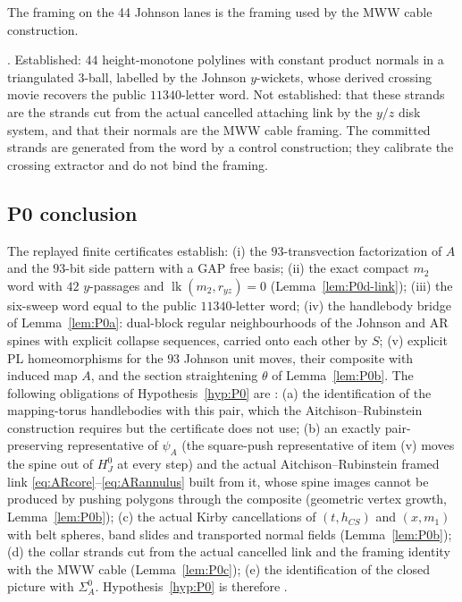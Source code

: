 \begin{lemma}\label{lem:P0c}
The framing on the 44 Johnson lanes is the framing used by the MWW cable
construction.
\end{lemma}

\begin{remark}
\Open.  Established: $44$ height-monotone polylines with constant product
normals in a triangulated $3$-ball, labelled by the Johnson $y$-wickets,
whose derived crossing movie recovers the public $11340$-letter word.  Not
established: that these strands are the strands cut from the actual
cancelled attaching link by the $y/z$ disk system, and that their normals
are the MWW cable framing.  The committed strands are generated from the
word by a control construction; they calibrate the crossing extractor and
do not bind the framing.
\end{remark}

\subsection{P0 conclusion}\label{sec:p0-conclusion}

\begin{proposition}\label{thm:P0discharge}
The replayed finite certificates establish: (i) the $93$-transvection
factorization of $A$ and the $93$-bit side pattern with a GAP free basis;
(ii) the exact compact $m_2$ word with $42$ $y$-passages and
$\operatorname{lk}(m_2,r_{yz})=0$ (Lemma~\ref{lem:P0d-link}); (iii) the
six-sweep word equal to the public $11340$-letter word; (iv) the
handlebody bridge of Lemma~\ref{lem:P0a}: dual-block regular
neighbourhoods of the Johnson and AR spines with explicit collapse
sequences, carried onto each other by $S$; (v) explicit PL homeomorphisms
for the $93$ Johnson unit moves, their composite with induced map $A$, and
the section straightening $\theta$ of Lemma~\ref{lem:P0b}.  The
following obligations of Hypothesis~\ref{hyp:P0} are \Open:
(a) the identification of the mapping-torus handlebodies with this pair,
which the Aitchison--Rubinstein construction requires but the certificate
does not use; (b) an exactly pair-preserving representative of $\psi_A$
(the square-push representative of item (v) moves the spine out of
$H_J^0$ at every step) and the actual Aitchison--Rubinstein framed
link \eqref{eq:ARcore}--\eqref{eq:ARannulus} built from it, whose spine
images cannot be produced by pushing polygons through the composite
(geometric vertex growth, Lemma~\ref{lem:P0b}); (c) the actual Kirby
cancellations of $(t,h_{CS})$ and $(x,m_1)$ with belt spheres, band slides
and transported normal fields (Lemma~\ref{lem:P0b}); (d) the collar strands
cut from the actual cancelled link and the framing identity with the MWW
cable (Lemma~\ref{lem:P0c}); (e) the identification of the closed picture
with $\Sigma_A^0$.  Hypothesis~\ref{hyp:P0} is therefore \Open.
\end{proposition}


